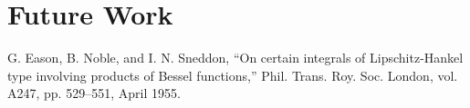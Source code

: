 \documentclass[conference]{IEEEtran}
\begin{document}
\section{Future Work}
\begin{comment}
	Please number citations consecutively within brackets \cite{b1}. The 
	sentence punctuation follows the bracket \cite{b2}. Refer simply to the reference 
	number, as in \cite{b3}---do not use ``Ref. \cite{b3}'' or ``reference \cite{b3}'' except at 
	the beginning of a sentence: ``Reference \cite{b3} was the first $\ldots$''
	
	Number footnotes separately in superscripts. Place the actual footnote at 
	the bottom of the column in which it was cited. Do not put footnotes in the 
	abstract or reference list. Use letters for table footnotes.
	
	Unless there are six authors or more give all authors' names; do not use 
	``et al.''. Papers that have not been published, even if they have been 
	submitted for publication, should be cited as ``unpublished'' \cite{b4}. Papers 
	that have been accepted for publication should be cited as ``in press'' \cite{b5}. 
	Capitalize only the first word in a paper title, except for proper nouns and 
	element symbols.
	
	For papers published in translation journals, please give the English 
	citation first, followed by the original foreign-language citation \cite{b6}.
\end{comment}
\begin{thebibliography}{00}
 G. Eason, B. Noble, and I. N. Sneddon, ``On certain integrals of Lipschitz-Hankel type involving products of Bessel functions,'' Phil. Trans. Roy. Soc. London, vol. A247, pp. 529--551, April 1955.
\end{thebibliography}
\end{document}
